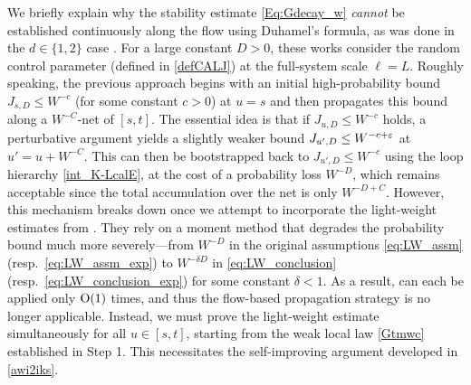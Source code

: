 \begin{remark}
We briefly explain why the stability estimate \eqref{Eq:Gdecay_w} \emph{cannot} be established continuously along the flow using Duhamel's formula, as was done in the $d \in \{1,2\}$ case \cite{YY_25,DYYY25,erdHos2025zigzag}.
For a large constant $D>0$, these works consider the random control parameter  (defined in \eqref{defCALJ}) at the full-system scale $\ell=L$.   
Roughly speaking, the previous approach begins with an initial high-probability bound $J_{s,D}\le W^{-c}$ (for some constant $c>0$) at $u=s$ and then propagates this bound along a $W^{-C}$-net of $[s,t]$. The essential idea is that if $J_{u,D}\le W^{-c}$ holds, a perturbative argument yields a slightly weaker bound $J_{u',D}\le W^{-c+{\varepsilon}}$ at $u'=u+W^{-C}$. This can then be bootstrapped back to $J_{u',D}\le W^{-c}$ using the loop hierarchy \eqref{int_K-LcalE}, at the cost of a probability loss $W^{-D}$, which remains acceptable since the total accumulation over the net is only $W^{-D+C}$.
However, this mechanism breaks down once we attempt to incorporate the light-weight estimates from . They rely on a moment method that degrades the probability bound much more severely---from $W^{-D}$ in the original assumptions \eqref{eq:LW_assm} (resp.~\eqref{eq:LW_assm_exp}) to $W^{-\delta D}$ in \eqref{eq:LW_conclusion} (resp.~\eqref{eq:LW_conclusion_exp}) for some constant $\delta <1$. As a result,  can each be applied only $\operatorname{O}(1)$ times, and thus the flow-based propagation strategy is no longer applicable. 
Instead, we must prove the light-weight estimate simultaneously for all $u\in[s,t]$, starting from the weak local law \eqref{Gtmwc} established in Step 1. This necessitates the self-improving argument developed in \eqref{awi2iks}. 



\end{remark}
